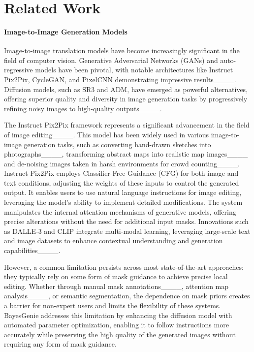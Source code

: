 \section{Related Work}
\paragraph{Image-to-Image Generation Models}
Image-to-image translation models have become increasingly significant in the field of computer vision. Generative Adversarial Networks (GANs) and auto-regressive models have been pivotal, with notable architectures like Instruct Pix2Pix, CycleGAN, and PixelCNN demonstrating impressive results____. Diffusion models, such as SR3 and ADM, have emerged as powerful alternatives, offering superior quality and diversity in image generation tasks by progressively refining noisy images to high-quality outputs____. 

The Instruct Pix2Pix framework represents a significant advancement in the field of image editing____. This model has been widely used in various image-to-image generation tasks, such as converting hand-drawn sketches into photographs____, transforming abstract maps into realistic map images____ and de-noising images taken in harsh environments for crowd counting____. Instruct Pix2Pix employs Classifier-Free Guidance (CFG) for both image and text conditions, adjusting the weights of these inputs to control the generated output. It enables users to use natural language instructions for image editing, leveraging the model's ability to implement detailed modifications. The system manipulates the internal attention mechanisms of generative models, offering precise alterations without the need for additional input masks. Innovations such as DALLE-3 and CLIP integrate multi-modal learning, leveraging large-scale text and image datasets to enhance contextual understanding and generation capabilities____. 

However, a common limitation persists across most state-of-the-art approaches: they typically rely on some form of mask guidance to achieve precise local editing. Whether through manual mask annotations____, attention map analysis____, or semantic segmentation, the dependence on mask priors creates a barrier for non-expert users and limits the flexibility of these systems. BayesGenie addresses this limitation by enhancing the diffusion model with automated parameter optimization, enabling it to follow instructions more accurately while preserving the high quality of the generated images without requiring any form of mask guidance.


